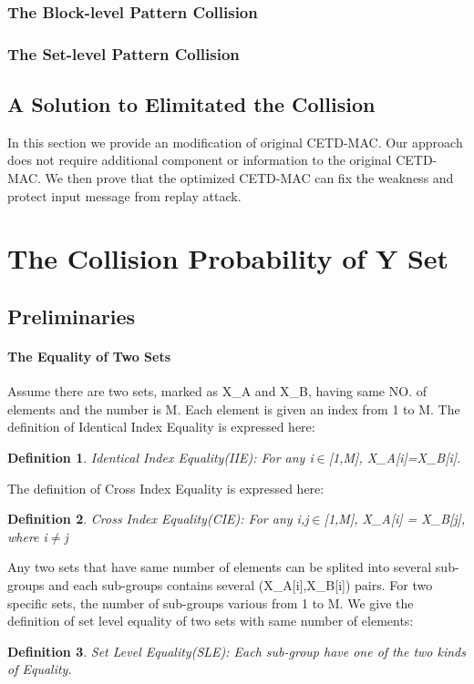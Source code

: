 \documentclass{article}
\newtheorem{defination}{Definition}[section]
\begin{document}
\subsubsection{The Block-level Pattern Collision}


\subsubsection{The Set-level Pattern Collision}

\subsection{A Solution to Elimitated the Collision}
In this section we provide an modification of original CETD-MAC. Our approach does not require additional component or information to the original CETD-MAC. We then prove that the optimized CETD-MAC can fix the weakness and protect input message from replay attack.

\section{The Collision Probability of Y Set}

\subsection{Preliminaries}
\paragraph{The Equality of Two Sets}
Assume there are two sets, marked as X\_A and X\_B, having same NO. of elements and the number is M. Each element is given an index from 1 to M. The definition of Identical Index Equality is expressed here:
\begin{defination}
Identical Index Equality(IIE): For any i$\in$[1,M], X\_A[i]=X\_B[i].
\end{defination}
The definition of Cross Index Equality is expressed here:
\begin{defination}
Cross Index Equality(CIE): For any i,j$\in$[1,M], X\_A[i] = X\_B[j], where i$\neq$j
\end{defination}

Any two sets that have same number of elements can be splited into several sub-groups and each sub-groups contains several (X\_A[i],X\_B[i]) pairs. For two specific sets, the number of sub-groups various from 1 to M. We give the definition of set level equality of two sets with same number of elements:
\begin{defination}
Set Level Equality(SLE): Each sub-group have one of the two kinds of Equality.
\end{defination}
\end{document}
